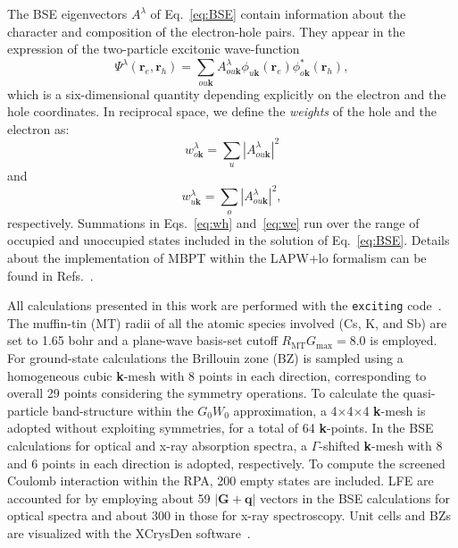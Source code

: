 \documentclass[aps,pra,superscriptaddress,twocolumn]{revtex4}
\begin{document}
The BSE eigenvectors $A^{\lambda}$ of Eq.~\eqref{eq:BSE} contain information about the character and composition of the electron-hole pairs.
They appear in the expression of the two-particle excitonic wave-function
%
\begin{equation}
\Psi^{\lambda}(\mathbf{r}_{e},\mathbf{r}_{h}) = \sum_{ou \mathbf{k}} A^{\lambda}_{ou\mathbf{k}}\phi_{u\mathbf{k}}(\mathbf{r}_{e})\phi^{*}_{o\mathbf{k}}(\mathbf{r}_{h}),
\label{eq:psi}
\end{equation}
%
which is a six-dimensional quantity depending explicitly on the electron and the hole coordinates. 
In reciprocal space, we define the \textit{weights} of the hole and the electron as:
%
\begin{equation}
w^{\lambda}_{o\mathbf{k}} = \sum_u |A^{\lambda}_{ou\mathbf{k}}|^2
\label{eq:wh}
\end{equation}
% 
and 
%
\begin{equation}
w^{\lambda}_{u\mathbf{k}} = \sum_o |A^{\lambda}_{ou\mathbf{k}}|^2,
\label{eq:we}
\end{equation}
% 
respectively.
Summations in Eqs.~\eqref{eq:wh} and~\eqref{eq:we} run over the range of occupied and unoccupied states included in the solution of Eq.~\eqref{eq:BSE}.
Details about the implementation of MBPT within the LAPW+lo formalism can be found in Refs.~\cite{pusc-ambr02prb,Sagmeister2009,nabo+16prb,vorw+17prb}.

All calculations presented in this work are performed with the \texttt{exciting} code~\cite{gula+14jpcm}.
The muffin-tin (MT) radii of all the atomic species involved (Cs, K, and Sb) are set to 1.65 bohr and a plane-wave basis-set cutoff $R_{\textrm{MT}}G_{\textrm{max}} = 8.0$ is employed.
For ground-state calculations the Brillouin zone (BZ) is sampled using a homogeneous cubic \textbf{k}-mesh with 8 points in each direction, corresponding to overall 29 points considering the symmetry operations.
To calculate the quasi-particle band-structure within the $G_0W_0$ approximation, a 4$\times$4$\times$4 \textbf{k}-mesh is adopted without exploiting symmetries, for a total of 64 \textbf{k}-points.
In the BSE calculations for optical and x-ray absorption spectra, a $\Gamma$-shifted \textbf{k}-mesh with 8 and 6 points in each direction is adopted, respectively. 
To compute the screened Coulomb interaction within the RPA, 200 empty states are included.
LFE are accounted for by employing about 59 $|\mathbf{G}+\mathbf{q}|$ vectors in the BSE calculations for optical spectra and about 300 in those for x-ray spectroscopy.
Unit cells and BZs are visualized with the XCrysDen software~\cite{xcrysden}.
\end{document}
